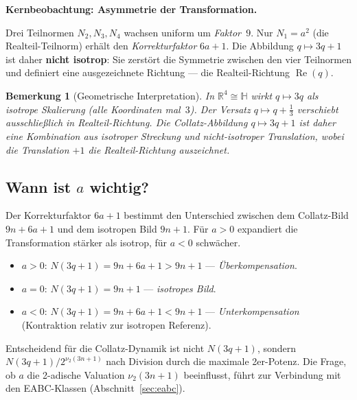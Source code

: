 \documentclass[12pt,a4paper]{article}
\newtheorem{bemerkung}[definition]{Bemerkung}
\newcommand{\vii}{\nu_2}
\newcommand{\R}{\mathbb{R}}
\newcommand{\HH}{\mathbb{H}}
\newcommand{\Re}{\operatorname{Re}}
\begin{document}
\begin{tcolorbox}[quaternion]
\textbf{Kernbeobachtung: Asymmetrie der Transformation.}

Drei Teilnormen $N_2, N_3, N_4$ wachsen uniform um \emph{Faktor~$9$}.
Nur $N_1 = a^2$ (die Realteil-Teilnorm) erhält den \emph{Korrekturfaktor} $6a+1$.
Die Abbildung $q \mapsto 3q+1$ ist daher \textbf{nicht isotrop}: Sie zerstört
die Symmetrie zwischen den vier Teilnormen und definiert eine ausgezeichnete
Richtung --- die Realteil-Richtung $\Re(q)$.
\end{tcolorbox}

\begin{bemerkung}[Geometrische Interpretation]
In $\R^4 \cong \HH$ wirkt $q \mapsto 3q$ als isotrope Skalierung (alle Koordinaten
mal~$3$). Der Versatz $q \mapsto q + \frac{1}{3}$ verschiebt ausschließlich in
Realteil-Richtung. Die Collatz-Abbildung $q \mapsto 3q + 1$ ist daher eine
\emph{Kombination aus isotroper Streckung und nicht-isotroper Translation},
wobei die Translation $+1$ die Realteil-Richtung auszeichnet.
\end{bemerkung}

\subsection{Wann ist \texorpdfstring{$a$}{a} wichtig?}

Der Korrekturfaktor $6a + 1$ bestimmt den Unterschied zwischen dem Collatz-Bild
$9n+6a+1$ und dem isotropen Bild $9n+1$. Für $a > 0$ expandiert die Transformation
stärker als isotrop, für $a < 0$ schwächer.

\begin{itemize}[noitemsep]
  \item $a > 0$: $N(3q+1) = 9n + 6a + 1 > 9n + 1$ --- \emph{Überkompensation}.
  \item $a = 0$: $N(3q+1) = 9n + 1$ --- \emph{isotropes Bild}.
  \item $a < 0$: $N(3q+1) = 9n + 6a + 1 < 9n + 1$ --- \emph{Unterkompensation} (Kontraktion relativ zur isotropen Referenz).
\end{itemize}

Entscheidend für die Collatz-Dynamik ist nicht $N(3q+1)$, sondern
$N(3q+1)/2^{\nu_2(3n+1)}$ nach Division durch die maximale 2er-Potenz.
Die Frage, ob $a$ die 2-adische Valuation $\vii(3n+1)$ beeinflusst, führt
zur Verbindung mit den EABC-Klassen (Abschnitt~\ref{sec:eabc}).

\end{document}
